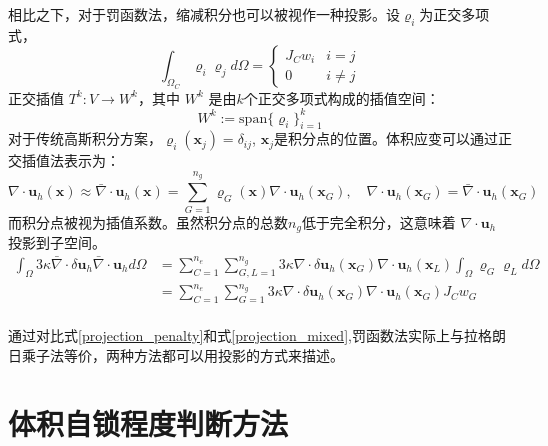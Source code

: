 相比之下，对于罚函数法，缩减积分也可以被视作一种投影。设$\varrho_i$为正交多项式，
\begin{equation}
    \int_{\Omega_C} \varrho_i \varrho_j d\Omega = 
    \begin{cases}
        J_C w_i  & i = j \\
        0 & i \ne j
    \end{cases}
\end{equation}
正交插值 $T^{k}: V \rightarrow W^{k}$，其中 $W^{k}$ 是由$k$个正交多项式构成的插值空间：
\begin{equation}
    W^{k}:= \mathrm{span}\{\varrho_i \}_{i=1}^{k}
\end{equation}
对于传统高斯积分方案，$\varrho_i(\boldsymbol x_j) = \delta_{ij}$, $\boldsymbol x_j$是积分点的位置。体积应变可以通过正交插值法表示为：
\begin{equation}
    \nabla \cdot \boldsymbol u_h(\boldsymbol x) \approx \bar \nabla \cdot \boldsymbol u_h(\boldsymbol x) = \sum_{G=1}^{n_g} \varrho_G(\boldsymbol x) \nabla \cdot \boldsymbol u_h(\boldsymbol x_G), \quad \nabla \cdot \boldsymbol u_h(\boldsymbol x_G) = \bar \nabla \cdot \boldsymbol u_h(\boldsymbol x_G)
\end{equation}
而积分点被视为插值系数。虽然积分点的总数$n_g$低于完全积分，这意味着 $\nabla \cdot \boldsymbol u_h$ 投影到子空间。
\begin{equation}\label{projection_penalty}
    \begin{split}
        \int_\Omega 3\kappa \bar \nabla \cdot \delta \boldsymbol u_h \bar \nabla \cdot \boldsymbol u_h d\Omega
        &= \sum_{C=1}^{n_e} \sum_{G,L=1}^{n_g} 3\kappa \nabla \cdot \delta \boldsymbol u_h(\boldsymbol x_G) \nabla \cdot \boldsymbol u_h(\boldsymbol x_L) \int_\Omega \varrho_G \varrho_L d\Omega  \\
        &= \sum_{C=1}^{n_e} \sum_{G=1}^{n_g} 3\kappa \nabla \cdot \delta \boldsymbol u_h(\boldsymbol x_G) \nabla \cdot \boldsymbol u_h(\boldsymbol x_G) J_C w_G \\
    \end{split}
\end{equation}

通过对比式\eqref{projection_penalty}和式\eqref{projection_mixed},罚函数法实际上与拉格朗日乘子法等价，两种方法都可以用投影的方式来描述。

\section{体积自锁程度判断方法}
